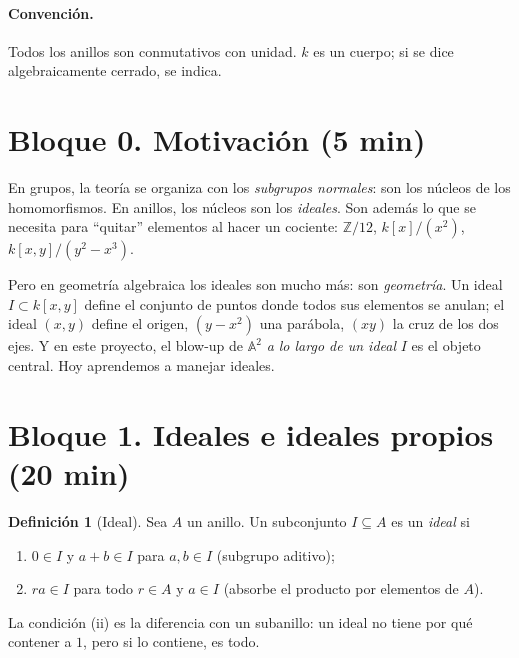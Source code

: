 \documentclass[11pt,a4paper]{article}
\newcommand{\ZZ}{\mathbb{Z}}
\newcommand{\A}{\mathbb{A}}
\theoremstyle{plain}
\theoremstyle{definition}
\newtheorem{definicion}[teorema]{Definición}
\theoremstyle{remark}
\newcounter{ej}
\begin{document}
\paragraph{Convención.} Todos los anillos son conmutativos con unidad. $k$ es un cuerpo; si se dice algebraicamente cerrado, se indica.

\section{Bloque 0. Motivación (5 min)}

En grupos, la teoría se organiza con los \emph{subgrupos normales}: son los núcleos de los homomorfismos. En anillos, los núcleos son los \emph{ideales}. Son además lo que se necesita para ``quitar'' elementos al hacer un cociente: $\ZZ/12$, $k[x]/(x^2)$, $k[x,y]/(y^2-x^3)$.

Pero en geometría algebraica los ideales son mucho más: son \emph{geometría}. Un ideal $I\subset k[x,y]$ define el conjunto de puntos donde todos sus elementos se anulan; el ideal $(x,y)$ define el origen, $(y-x^2)$ una parábola, $(xy)$ la cruz de los dos ejes. Y en este proyecto, el blow-up de $\A^2$ \emph{a lo largo de un ideal} $I$ es el objeto central. Hoy aprendemos a manejar ideales.

\section{Bloque 1. Ideales e ideales propios (20 min)}

\begin{definicion}[Ideal]
Sea $A$ un anillo. Un subconjunto $I\subseteq A$ es un \emph{ideal} si
\begin{enumerate}[label=(\roman*),itemsep=1pt]
\item $0\in I$ y $a+b\in I$ para $a,b\in I$ (subgrupo aditivo);
\item $ra\in I$ para todo $r\in A$ y $a\in I$ (absorbe el producto por elementos de $A$).
\end{enumerate}
\end{definicion}

La condición (ii) es la diferencia con un subanillo: un ideal no tiene por qué contener a $1$, pero si lo contiene, es todo.
\end{document}
